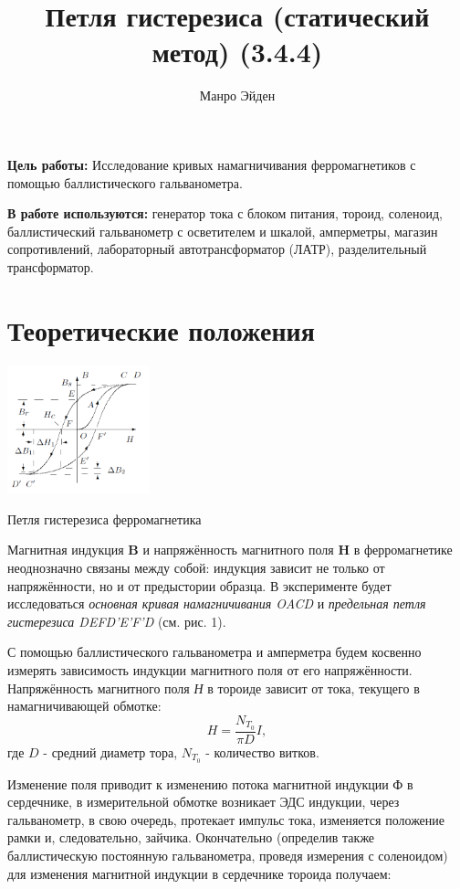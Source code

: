 \documentclass[a4paper, 12pt]{article}
\title{\textbf{Петля гистерезиса (статический метод) (3.4.4)}}
\author{Манро Эйден}
\date{}
\begin{document}
\maketitle

\noindent \textbf{Цель работы:} Исследование кривых намагничивания ферромагнетиков с помощью баллистического гальванометра.

\bigskip

\noindent \textbf{В работе используются:} генератор тока с блоком питания, тороид, соленоид, баллистический гальванометр с осветителем и шкалой, амперметры, магазин сопротивлений, лабораторный автотрансформатор (ЛАТР), разделительный трансформатор.

\section*{Теоретические положения}

\begin{floatingfigure}{41mm}
\noindent
\hfil
\includegraphics[width=41mm]{fig1.PNG}
\hfil
\caption{Петля гистерезиса ферромагнетика}
\label{figCurvesFF}
\end{floatingfigure}

Магнитная индукция \textbf{B} и напряжённость магнитного поля \textbf{H} в ферромагнетике неоднозначно связаны между собой: индукция зависит не только от напряжённости, но и от предыстории образца. В эксперименте будет исследоваться \textit{основная кривая намагничивания OACD} и \textit{предельная петля гистерезиса DEFD'E'F'D} (см. рис. 1).

С помощью баллистического гальванометра и амперметра будем косвенно измерять зависимость индукции магнитного поля от его напряжённости. \\
Напряжённость магнитного поля \textit{Н} в тороиде зависит от тока, текущего в намагничивающей обмотке:
\begin{equation}
    H = \frac{N_{T_0}}{\pi D}I,
\end{equation} 
где $D$ - средний диаметр тора, $N_{T_0}$ - количество витков.

Изменение поля приводит к изменению потока магнитной индукции Ф в сердечнике, в измерительной обмотке возникает ЭДС индукции, через гальванометр, в свою очередь, протекает импульс тока, изменяется положение рамки и, следовательно, зайчика. Окончательно (определив также баллистическую постоянную гальванометра, проведя измерения с соленоидом) для изменения магнитной индукции в сердечнике тороида получаем:
\end{document}
